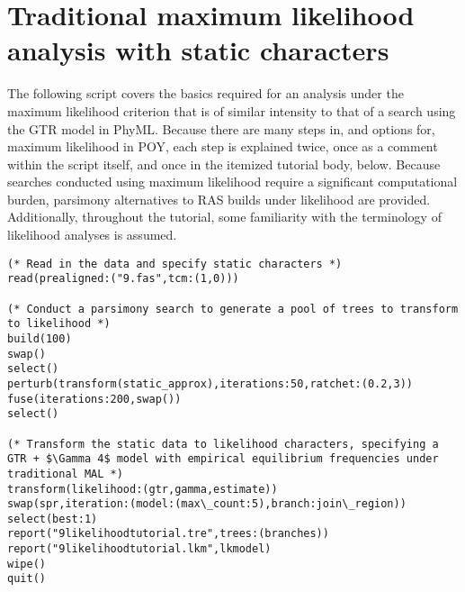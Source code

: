 \section{Traditional maximum likelihood analysis with static characters}{\label{tutorial10}}
The following script covers the basics required for an analysis under the maximum likelihood criterion that is of similar intensity to that of a search using the GTR model in PhyML. Because there are many steps in, and options for, maximum likelihood in POY, each step is explained twice, once as a comment within the script itself, and once in the itemized tutorial body, below. Because searches conducted using maximum likelihood require a significant computational burden, parsimony alternatives to RAS builds under likelihood are provided. Additionally, throughout the tutorial, some familiarity with the terminology of likelihood analyses is assumed.

\begin{verbatim}
(* Read in the data and specify static characters *)
read(prealigned:("9.fas",tcm:(1,0)))

(* Conduct a parsimony search to generate a pool of trees to transform to likelihood *)
build(100)
swap()
select()
perturb(transform(static_approx),iterations:50,ratchet:(0.2,3))
fuse(iterations:200,swap())
select()

(* Transform the static data to likelihood characters, specifying a GTR + $\Gamma 4$ model with empirical equilibrium frequencies under traditional MAL *)
transform(likelihood:(gtr,gamma,estimate))
swap(spr,iteration:(model:(max\_count:5),branch:join\_region))
select(best:1)
report("9likelihoodtutorial.tre",trees:(branches))
report("9likelihoodtutorial.lkm",lkmodel)
wipe()
quit()
\end{verbatim}


